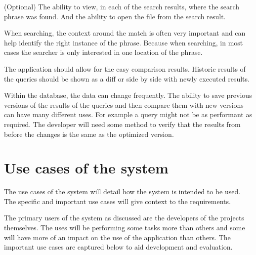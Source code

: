 \begin{requirement}{(Optional)}
The ability to view, in each of the search results, where the search phrase was
found. And the ability to open the file from the search result.

When searching, the context around the match is often very important and can
help identify the right instance of the phrase. Because when searching, in most
cases the searcher is only interested in one location of the phrase.
\end{requirement}

\begin{requirement}
The application should allow for the easy comparison results. Historic results
of the queries should be shown as a diff or side by side with newly executed
results.

Within the database, the data can change frequently. The ability to save
previous versions of the results of the queries and then compare them with new
versions can have many different uses. For example a query might not be as
performant as required. The developer will need some method to verify that the
results from before the changes is the same as the optimized version.
\end{requirement}

\section{Use cases of the system}\label{use-cases-of-the-system}

The use cases of the system will detail how the system is intended to be used.
The specific and important use cases will give context to the requirements.

The primary users of the system as discussed are the developers of the projects
themselves. The uses will be performing some tasks more than others and some
will have more of an impact on the use of the application than others. The
important use cases are captured below to aid development and evaluation.

